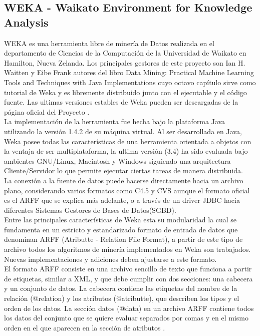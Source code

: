 \subsection{WEKA - Waikato Environment for Knowledge Analysis}
WEKA es una herramienta libre de miner\'ia de Datos realizada en el departamento de Ciencias de la Computaci\'on
de la Universidad de Waikato en Hamilton, Nueva Zelanda.  Los principales gestores de este proyecto son Ian H.
Waitten y Eibe Frank autores del libro Data Mining: Practical Machine Learning Tools and Techniques with Java
Implementations \cite{37} cuyo octavo cap\'itulo sirve como tutorial de Weka y es libremente distribuido junto con
el ejecutable y el c\'odigo fuente.  Las ultimas versiones estables de Weka pueden ser descargadas de la p\'agina
oficial del Proyecto \cite{38}.\\

La implementaci\'on de la herramienta fue hecha bajo la plataforma Java utilizando la versi\'on 1.4.2 de su
m\'aquina virtual.  Al ser desarrollada en Java, Weka posee todas las caracter\'isticas de una herramienta
orientada a objetos con la ventaja de ser multiplataforma, la ultima versi\'on (3.4) ha sido evaluada bajo
ambientes GNU/Linux, Macintosh y Windows siguiendo una arquitectura Cliente/Servidor lo que permite ejecutar
ciertas tareas de mane\-ra distribuida.\\

La conexi\'on a la fuente de datos puede hacerse directamente hacia un archivo plano, considerando varios formatos
como C4.5 y CVS aunque el formato oficial es el ARFF que se explica m\'as adelante, o a trav\'es de un driver JDBC
hacia diferentes Sistemas Gestores de Bases de Datos(SGBD).\\

Entre las principales caracter\'isticas de Weka esta su modularidad la cual se fundamenta en un estricto y
estandarizado formato de entrada de datos que denominan ARFF (Atributte - Relation File Format), a partir de este
tipo de archivo todos los algoritmos de miner\'ia implementados en Weka son trabajados.  Nuevas implementaciones y
adiciones deben ajustarse a este formato.\\

El formato ARFF consiste en una archivo sencillo de texto que funciona a partir de etiquetas, similar a XML, y
que debe cumplir con dos secciones: una cabecera y un conjunto de datos.  La cabecera contiene las etiquetas del
nombre de la relaci\'on (@relation) y los atributos (@atributte), que describen los tipos y el orden de los
datos. La secci\'on datos (@data) en un archivo ARFF contiene todos los datos del conjunto que se quiere evaluar
separados por comas y en el mismo orden en el que aparecen en la secci\'on de atributos \cite{arff}.\\

